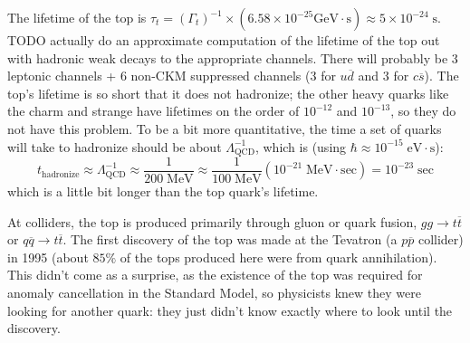 \documentclass[11pt, oneside]{article}   	%
\theoremstyle{definition}
\numberwithin{equation}{subsection}		%
\begin{document}
The lifetime of the top is $\tau_t = (\Gamma_t)^{-1} \times (6.58\times 10^{-25} \mathrm{GeV}\cdot\mathrm{s})\approx 5\times 
10^{-24} \;\mathrm{s}$. {\color{red} TODO actually do an approximate computation of the lifetime of the top out with hadronic weak decays 
to the appropriate channels. There will probably be 3 leptonic channels + 6 non-CKM suppressed channels (3 for $u\overline d$ and 3 for 
$c\overline s$)}. 
The top's lifetime is so short that it does not hadronize; the other heavy quarks like the charm and strange have lifetimes on the order of 
$10^{-12}$ and $10^{-13}$, so they do not have this problem. To be a bit more quantitative, the time a set of quarks will take to hadronize 
should be about $\Lambda_\mathrm{QCD}^{-1}$, which is (using $\hbar\approx 10^{-15}\;\mathrm{eV}\cdot\mathrm{s}$):
\begin{equation}
	t_\mathrm{hadronize} \approx\Lambda_\mathrm{QCD}^{-1}\approx \frac{1}{200\;\mathrm{MeV}} \approx \frac{1}{100\;\mathrm{MeV}}\left(10^{-21}\;\mathrm{MeV}\cdot\mathrm{sec}\right) = 10^{-23}\;\mathrm{sec}
\end{equation}
which is a little bit longer than the top quark's lifetime.

At colliders, the top is produced primarily through gluon or quark fusion, $gg\rightarrow t\overline t$ or $q\overline q\rightarrow t\overline t$. 
The first discovery of the top was made at the Tevatron (a $p\overline p$ collider) in 1995 (about $85\%$ of the tops produced here were 
from quark annihilation). This didn't come as a surprise, as the existence of the top was required for anomaly cancellation in the Standard 
Model, so physicists knew they were looking for another quark: they just didn't know exactly where to look until the discovery. 
\end{document}
